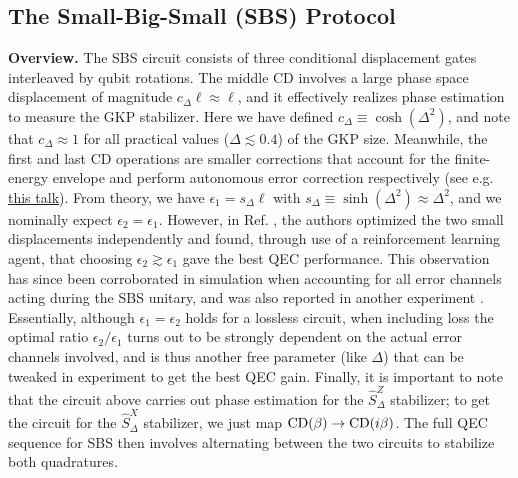 \subsection{The Small-Big-Small (SBS) Protocol}
\textbf{Overview.} The SBS circuit consists of three conditional displacement gates interleaved by qubit rotations. The middle CD involves a large phase space displacement of magnitude $c_\Delta \ell \approx \ell$, and it effectively realizes phase estimation to measure the GKP stabilizer. Here we have defined $c_\Delta \equiv \cosh(\Delta^2)$, and note that $c_\Delta \approx 1$ for all practical values ($\Delta \lesssim 0.4$) of the GKP size. Meanwhile, the first and last CD operations are smaller corrections that account for the finite-energy envelope and perform autonomous error correction respectively (see e.g. \href{https://youtu.be/TOQzHkgsH_E?t=1045}{this talk}). From theory, we have $\epsilon_1 = s_\Delta \ell$ with $s_\Delta \equiv \sinh(\Delta^2) \approx \Delta^2$, and we nominally expect $\epsilon_2 = \epsilon_1$. However, in Ref. \cite{sivak2023gkp-expt}, the authors optimized the two small displacements independently and found, through use of a reinforcement learning agent, that choosing $\epsilon_2 \gtrsim \epsilon_1$ gave the best QEC performance. This observation has since been corroborated in simulation when accounting for all error channels acting during the SBS unitary, and was also reported in another experiment \cite{nordquantique2023gkp-expt}. Essentially, although $\epsilon_1 = \epsilon_2$ holds for a lossless circuit, when including loss the optimal ratio $\epsilon_2/\epsilon_1$ turns out to be strongly dependent on the actual error channels involved, and is thus another free parameter (like $\Delta$) that can be tweaked in experiment to get the best QEC gain. Finally, it is important to note that the circuit above carries out phase estimation for the $\hat{S}_\Delta^{Z}$ stabilizer; to get the circuit for the $\hat{S}_\Delta^{X}$ stabilizer, we just map ${\rm CD}(\beta) \to {\rm CD}(i\beta)$. The full QEC sequence for SBS then involves alternating between the two circuits to stabilize both quadratures. 

